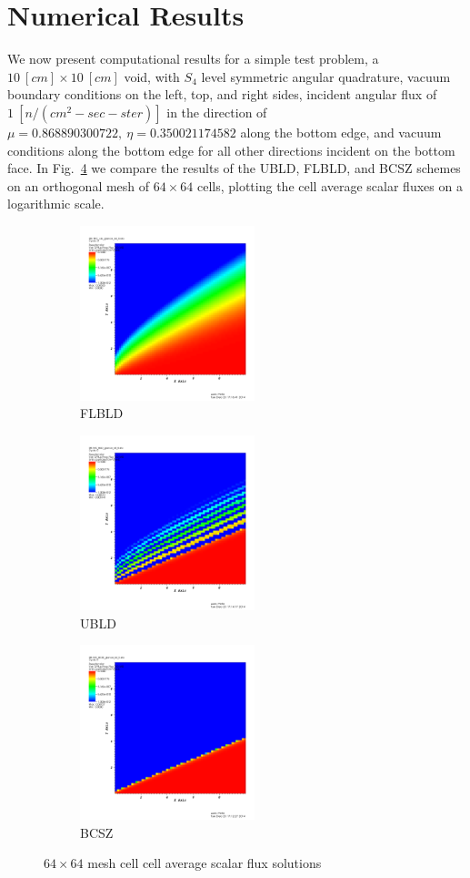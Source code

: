 \documentclass{mc2015}
\newcommand{\fig}[1]{Fig.~\ref{#1}}                      %
\begin{document}
\section{Numerical Results}
\label{sec:results}
We now present computational results for a simple test problem, a $10~[cm] \times 10~[cm]$ void, with $S_4$ level symmetric angular quadrature,
 vacuum boundary conditions on the left, top, and right sides, incident angular flux of $1~[n/(cm^2-sec-ster)]$ in the direction of $\mu=0.868890300722,~\eta = 0.350021174582$ along the bottom edge, and vacuum conditions along the bottom edge for all other directions incident on the bottom face.
In \fig{fig:negatives} we compare the results of the UBLD, FLBLD, and BCSZ schemes on an orthogonal mesh of $64\times 64$ cells, plotting the cell average scalar fluxes on a logarithmic scale.
\begin{figure}[h]
	\begin{center}
		\begin{subfigure}{0.3\textwidth}
			\includegraphics[width=2in]{cb_64.png}
			\caption{FLBLD}
			\label{fig:scb_64}		
		\end{subfigure}
		\begin{subfigure}{0.3\textwidth}
			\includegraphics[width=2in]{bild_64.png}
			\caption{UBLD}
			\label{fig:bild_64}		
		\end{subfigure}
		\begin{subfigure}{0.3\textwidth}
			\includegraphics[width=2in]{bcsz_64.png}
			\caption{BCSZ}
			\label{fig:bcsz_64}		
		\end{subfigure}
	\end{center}
	\caption{$64\times 64$ mesh cell cell average scalar flux solutions}
	\label{fig:negatives}
\end{figure}
\end{document}
